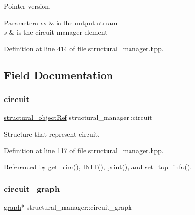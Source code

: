 Pointer version. 
\begin{DoxyParams}{Parameters}
{\em os} & is the output stream \\
\hline
{\em s} & is the circuit manager element \\
\hline
\end{DoxyParams}


Definition at line 414 of file structural\+\_\+manager.\+hpp.



\subsection{Field Documentation}
\mbox{\label{classstructural__manager_a1ec86354bfec056cc3bd6fd7aa89b6a9}} 
\subsubsection{\texorpdfstring{circuit}{circuit}}
{\footnotesize\ttfamily \hyperlink{structural__objects_8hpp_a8ea5f8cc50ab8f4c31e2751074ff60b2}{structural\+\_\+object\+Ref} structural\+\_\+manager\+::circuit\hspace{0.3cm}{\ttfamily [private]}}



Structure that represent circuit. 



Definition at line 117 of file structural\+\_\+manager.\+hpp.



Referenced by get\+\_\+circ(), I\+N\+I\+T(), print(), and set\+\_\+top\+\_\+info().

\mbox{\label{classstructural__manager_a57a50d52692ac18f10a722707cd88d2b}} 
\subsubsection{\texorpdfstring{circuit\+\_\+graph}{circuit\_graph}}
{\footnotesize\ttfamily \hyperlink{structgraph}{graph}$\ast$ structural\+\_\+manager\+::circuit\+\_\+graph\hspace{0.3cm}{\ttfamily [private]}}



